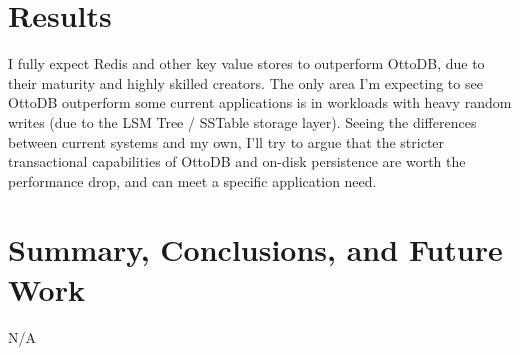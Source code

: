 \documentclass[conference]{IEEEtran}
\begin{document}
    \section{Results}
    I fully expect Redis \cite{b1} and other key value stores to outperform OttoDB, due to their maturity and highly skilled creators. The only area I’m expecting to see OttoDB outperform some current applications is in workloads with heavy random writes (due to the LSM Tree / SSTable storage layer). Seeing the differences between current systems and my own, I’ll try to argue that the stricter transactional capabilities of OttoDB and on-disk persistence are worth the performance drop, and can meet a specific application need.

    \section{Summary, Conclusions, and Future Work}
    N/A

    
    
    
\end{document}
